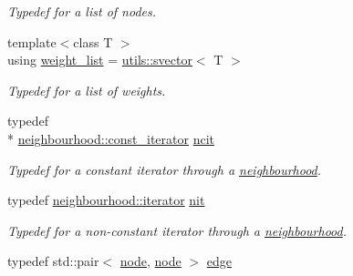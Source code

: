 \begin{DoxyCompactItemize}
\begin{DoxyCompactList}\small\item\em Typedef for a list of nodes. \end{DoxyCompactList}\item 
\hypertarget{namespacelgraph_a1e0fd5ef0a78b2a92da48adbed265cb6}{{\footnotesize template$<$class T $>$ }\\using \hyperlink{namespacelgraph_a1e0fd5ef0a78b2a92da48adbed265cb6}{weight\-\_\-list} = \hyperlink{classlgraph_1_1utils_1_1svector}{utils\-::svector}$<$ T $>$}\label{namespacelgraph_a1e0fd5ef0a78b2a92da48adbed265cb6}

\begin{DoxyCompactList}\small\item\em Typedef for a list of weights. \end{DoxyCompactList}\item 
\hypertarget{namespacelgraph_a9db6fe3bec7403f09c603c229beb7e40}{typedef \\*
\hyperlink{classlgraph_1_1utils_1_1svector_a50774ce617a742e76f3fb8cc0a7a9445}{neighbourhood\-::const\-\_\-iterator} \hyperlink{namespacelgraph_a9db6fe3bec7403f09c603c229beb7e40}{ncit}}\label{namespacelgraph_a9db6fe3bec7403f09c603c229beb7e40}

\begin{DoxyCompactList}\small\item\em Typedef for a constant iterator through a \hyperlink{namespacelgraph_a052e7766c13f3a43cec0aec8173fdede}{neighbourhood}. \end{DoxyCompactList}\item 
\hypertarget{namespacelgraph_ad402f72c6d926f6e75ba3523515e0e4a}{typedef \hyperlink{classlgraph_1_1utils_1_1svector_a518288794e754e27d2e2274ced4485a6}{neighbourhood\-::iterator} \hyperlink{namespacelgraph_ad402f72c6d926f6e75ba3523515e0e4a}{nit}}\label{namespacelgraph_ad402f72c6d926f6e75ba3523515e0e4a}

\begin{DoxyCompactList}\small\item\em Typedef for a non-\/constant iterator through a \hyperlink{namespacelgraph_a052e7766c13f3a43cec0aec8173fdede}{neighbourhood}. \end{DoxyCompactList}\item 
\hypertarget{namespacelgraph_a76bd7d50719f03de7a85db259d80d572}{typedef std\-::pair$<$ \hyperlink{namespacelgraph_a397169dd66adf725210a30fb7251773e}{node}, \hyperlink{namespacelgraph_a397169dd66adf725210a30fb7251773e}{node} $>$ \hyperlink{namespacelgraph_a76bd7d50719f03de7a85db259d80d572}{edge}}\label{namespacelgraph_a76bd7d50719f03de7a85db259d80d572}


\end{DoxyCompactItemize}
